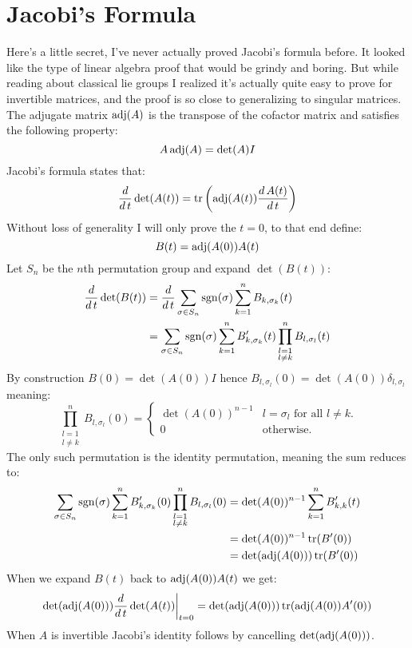 
\section{Jacobi's Formula}
Here's a little secret,
I've never actually proved Jacobi's formula before.
It looked like the type of linear algebra proof that would be grindy and boring.
But while reading about classical lie groups I realized it's actually quite easy to prove for invertible matrices,
and the proof is so close to generalizing to singular matrices.
\\

The adjugate matrix $\operatorname{adj}(A)$ is the transpose of the cofactor matrix and satisfies the following property:
\[A\operatorname{adj}(A) = \det(A)I\]
Jacobi's formula states that:
\[\frac{d}{d\,t}\det(A(t)) = \operatorname{tr}\left(\operatorname{adj}(A(t))\frac{d\,A(t)}{d\,t}\right)\]
Without loss of generality I will only prove the $t=0$,
to that end define:
\[B(t)=\operatorname{adj}(A(0))A(t)\]
Let $S_n$ be the $n$th permutation group and expand $\det(B(t))$:
\[\begin{aligned}
	\frac{d}{d\,t}\det(B(t)) &= \frac{d}{d\,t}\sum_{\sigma\in S_n}\operatorname{sgn}(\sigma)\sum_{k=1}^nB_{k,\sigma_k}(t)\\ 
	&= \sum_{\sigma\in S_n}\operatorname{sgn}(\sigma)\sum_{k=1}^nB'_{k,\sigma_k}(t)\prod_{\substack{l=1\\l\neq k}}^nB_{l,\sigma_l}(t)\\ 
\end{aligned}\]
By construction $B(0)=\det(A(0))I$ hence $B_{l,\sigma_l}(0)=\det(A(0))\delta_{l,\sigma_l}$ meaning:
\[\prod_{\substack{l=1\\l\neq k}}^nB_{l,\sigma_l}(0) = \begin{cases} \det(A(0))^{n-1} & l=\sigma_l \text{ for all $l\neq k$.}\\ 0 & \text{otherwise.}\end{cases}\]
The only such permutation is the identity permutation, meaning the sum reduces to:
\[\begin{aligned}
	\sum_{\sigma\in S_n}\operatorname{sgn}(\sigma)\sum_{k=1}^nB'_{k,\sigma_k}(0)\prod_{\substack{l=1\\l\neq k}}^nB_{l,\sigma_l}(0)&= \det(A(0))^{n-1}\sum_{k=1}^nB'_{k,k}(t) \\
	&=\det(A(0))^{n-1}\operatorname{tr}(B'(0))\\
	&=\det(\operatorname{adj}(A(0)))\operatorname{tr}(B'(0))\\
\end{aligned}\]
When we expand $B(t)$ back to $\operatorname{adj}(A(0))A(t)$ we get:
\[ \det(\operatorname{adj}(A(0)))\frac{d}{d\,t}\det(A(t))\bigg|_{t=0} = \det(\operatorname{adj}(A(0)))\operatorname{tr}(\operatorname{adj}(A(0))A'(0)) \]
When $A$ is invertible Jacobi's identity follows by cancelling $\det(\operatorname{adj}(A(0)))$.
